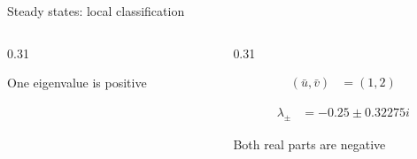 \begin{frame}{Steady states: local classification}
\begin{columns}[T,onlytextwidth]
\begin{column}{0.31\textwidth}
      \vspace{-0.34cm}

        {One eigenvalue is positive}
    \end{column}

    \begin{column}{0.31\textwidth}
      \centering

      {\color{HydraGreen}\bfseries\fontsize{10.4}{13.2}\selectfont
      \begin{align*}
        (\bar u,\bar v)
        &=
        (1,2)
      \end{align*}
      }

      \vspace{-0.42cm}

      {\color{HydraWhite}\fontsize{9.1}{11.5}\selectfont
      \begin{align*}
        \lambda_\pm
        &=
        -0.25\pm0.32275i
      \end{align*}
      }

      \vspace{-0.00cm}

        {Both real parts are negative}
    \end{column}

  \end{columns}

  \vspace{0.02cm}


\end{frame}


